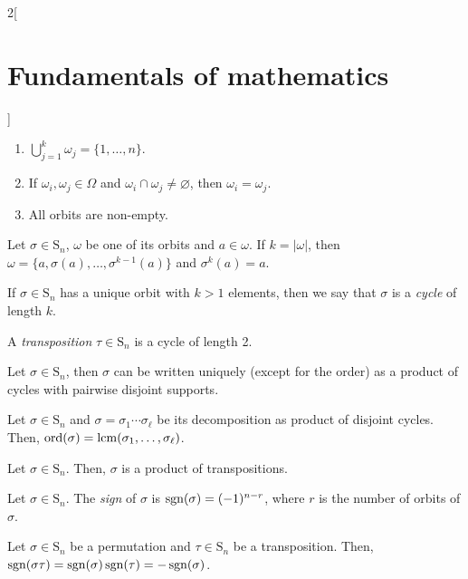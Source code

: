 \documentclass[../../../main.tex]{subfiles}
\begin{document}
\begin{multicols}{2}[\section{Fundamentals of mathematics}]
\begin{theorem}
    \begin{enumerate}
      \item $\bigcup_{j=1}^k \omega_j=\{1,\ldots,n\}$.
      \item If $\omega_i,\omega_j\in\Omega$ and $\omega_i\cap\omega_j\ne\varnothing$, then $\omega_i=\omega_j$.
      \item All orbits are non-empty.
    \end{enumerate}
  \end{theorem}
  \begin{theorem}
    Let $\sigma\in \text{S}_n$, $\omega$ be one of its orbits and $a\in\omega$. If $k=|\omega|$, then $\omega=\{a,\sigma(a),\ldots,\sigma^{k-1}(a)\}$ and $\sigma^k(a)=a$.
  \end{theorem}
  \begin{definition}
    If $\sigma\in \text{S}_n$ has a unique orbit with $k>1$ elements, then we say that $\sigma$ is a \emph{cycle} of length $k$.
  \end{definition}
  \begin{definition}
    A \emph{transposition} $\tau\in \text{S}_n$ is a cycle of length 2.
  \end{definition}
  \begin{theorem}
    Let $\sigma\in \text{S}_n$, then $\sigma$ can be written uniquely (except for the order) as a product of cycles with pairwise disjoint supports.
  \end{theorem}
  \begin{corollary}
    Let $\sigma\in \text{S}_n$ and $\sigma=\sigma_1\cdots\sigma_\ell$ be its decomposition as product of disjoint cycles. Then, $\text{ord}(\sigma)=\operatorname{lcm}(\sigma_1,\ldots,\sigma_\ell)$.
  \end{corollary}
  \begin{corollary}
    Let $\sigma\in \text{S}_n$. Then, $\sigma$ is a product of transpositions.
  \end{corollary}
  \begin{definition}
    Let $\sigma\in \text{S}_n$. The \emph{sign} of $\sigma$ is $\operatorname{sgn}(\sigma)=(-1)^{n-r}$, where $r$ is the number of orbits of $\sigma$.
  \end{definition}
  \begin{theorem}
    Let $\sigma\in \text{S}_n$ be a permutation and $\tau\in \text{S}_n$ be a transposition. Then, $\operatorname{sgn}(\sigma\tau)=\operatorname{sgn}(\sigma)\operatorname{sgn}(\tau)=-\operatorname{sgn}(\sigma)$.
  \end{theorem}
  \begin{corollary}

\end{corollary}
\end{multicols}
\end{document}
